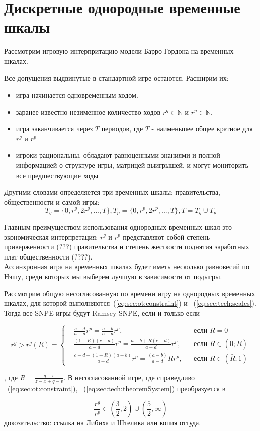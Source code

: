 
\section{Дискретные однородные временные шкалы} 

Рассмотрим игровую интерпритацию модели Барро-Гордона на временных шкалах.

Все допущения выдвинутые в стандартной игре остаются. Расширим их:
\begin{itemize}
\item игра начинается одновременным ходом. 
\item заранее известно незименное количество ходов $r^g \in \mathbb{N}$ и $r^p \in \mathbb{N}$.
\item игра заканчивается через $T$ периодов, где $T$ - наименьшее общее кратное для $r^g$ и $r^p$
\item игроки рациональны, обладают равноценными знаниями и полной информацией о структуре игры, матрицей выигрышей, и могут мониторить все предшествующие ходы
 \end{itemize}

Другими словами определяется три временных шкалы: правительства, общественности и самой игры:
\begin{equation}
\label{eq:sec:tech:scales}
T_g = \{0,r^g,2r^g,...,T\}, T_p=\{0,r^p,2r^p,...,T\}, T=T_g\cup T_p 
\end{equation}

Главным преимуществом использования однородных временных шкал это экономическая интерпретация: $r^g$ и $r^p$ представляют собой степень приверженности (???) правительства и степень жесткости поднятия заработных плат общественности (????).
\\

Ассинхронная игра на временных шкалах будет иметь несколько равновесий по Нэшу, среди которых мы выберем лучшую в зависимости от подыгры.

\begin{theorem}
	Рассмотрим общую несогласованную по времени игру на однородных временных шкалах, для которой выполняются~(\ref{eq:sec:ot:constraint}) и ~(\ref{eq:sec:tech:scales}). Тогда все SNPE игры будут Ramsey SNPE, если и только если
	
	\begin{equation}
		\label{eq:sec:tech:theoremSystem}
		r^g> \bar{r^g}(R) = \left\{ 
		\begin{aligned} 
			&\frac{c - d}{a-d}r^p= \frac{a-b}{a-d}r^p, &&\text{если } R=0
			\\
			&\frac{(1+R)(c-d)}{a-d}r^p= \frac{a-b + R(c-d)}{a-d}r^p, &&\text{если } 	R\in(0; \bar{R})
			\\
			&\frac{c-d-(1-R)(a-b)}{a-d}r^p= \frac{(a-b)}{a-d}Rr^p, &&\text{если } 	R\in(\bar{R};1)
		\end{aligned}
		\right.		
	\end{equation}
\end{theorem}
, где $\bar{R}=\frac{q-v}{z-x+q-v}$. В несогласованной игре, где справедливо ~(\ref{eq:sec:ot:constraint}),  ~(\ref{eq:sec:tech:theoremSystem}) преобразуется в 

\begin{equation}
	\frac{r^g}{r^p} \in \left(\frac{3}{2}, 2\right)\cup \left(\frac{5}{2}, \infty\right)
\end{equation}
докозательство: ссылка на Либиха и Штелика или копия оттуда.